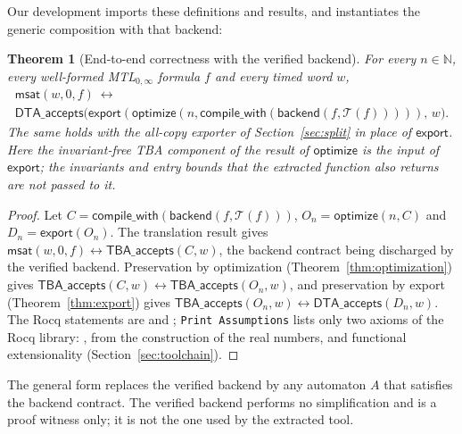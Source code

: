 \documentclass[preprint,12pt]{elsarticle}
\let\pathfragile\path
\DeclareRobustCommand\path{\pathfragile}
\providecommand{\Nat}{\mathbb{N}}
\providecommand{\T}{\mathcal{T}}
\providecommand{\optimize}{\mathsf{optimize}}
\providecommand{\export}{\mathsf{export}}
\newtheorem{theorem}{Theorem}[section]
\begin{document}
Our development imports these definitions and results, and instantiates the generic composition with that backend:
\begin{theorem}[End-to-end correctness with the verified backend]
\label{thm:composition}
For every $n\in\Nat$, every well-formed MTL$_{0,\infty}$ formula $f$ and every timed word $w$,
\[
  \begin{multlined}
  \mathsf{msat}(w,0,f)\ \leftrightarrow\\
  \mathsf{DTA\_accepts}\bigl(\export(\optimize(n,\mathsf{compile\_with}(\mathsf{backend}(f,\T(f))))),\,w\bigr).
  \end{multlined}
\]
The same holds with the all-copy exporter of Section~\ref{sec:split} in place of $\export$. Here the invariant-free TBA component of the result of $\optimize$ is the input of $\export$; the invariants and entry bounds that the extracted function also returns are not passed to it.
\end{theorem}
\begin{proof}
Let $C=\mathsf{compile\_with}(\mathsf{backend}(f,\T(f)))$, $O_n=\optimize(n,C)$ and $D_n=\export(O_n)$. The translation result gives $\mathsf{msat}(w,0,f)\leftrightarrow\mathsf{TBA\_accepts}(C,w)$, the backend contract being discharged by the verified backend. Preservation by optimization (Theorem~\ref{thm:optimization}) gives $\mathsf{TBA\_accepts}(C,w)\leftrightarrow\mathsf{TBA\_accepts}(O_n,w)$, and preservation by export (Theorem~\ref{thm:export}) gives $\mathsf{TBA\_accepts}(O_n,w)\leftrightarrow\mathsf{DTA\_accepts}(D_n,w)$. The Rocq statements are  and ; \texttt{Print Assumptions} lists only two axioms of the Rocq library: , from the construction of the real numbers, and functional extensionality (Section~\ref{sec:toolchain}).
\end{proof}
The general form  replaces the verified backend by any automaton $A$ that satisfies the backend contract. The verified backend performs no simplification and is a proof witness only; it is not the one used by the extracted tool.
\end{document}

